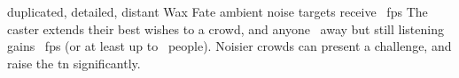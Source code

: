   {duplicated, detailed, distant}%
  {Wax}%
  {Fate}%
  {ambient noise}%
  {targets receive \rollConv~\glspl{fp}}%
  {
    The caster extends their best wishes to a crowd, and anyone \spellRange\ away but still listening gains \rollConv~\glspl{fp} (or at least up to \spellArea\ people).
    Noisier crowds can present a challenge, and raise the \gls{tn} significantly.
  }

